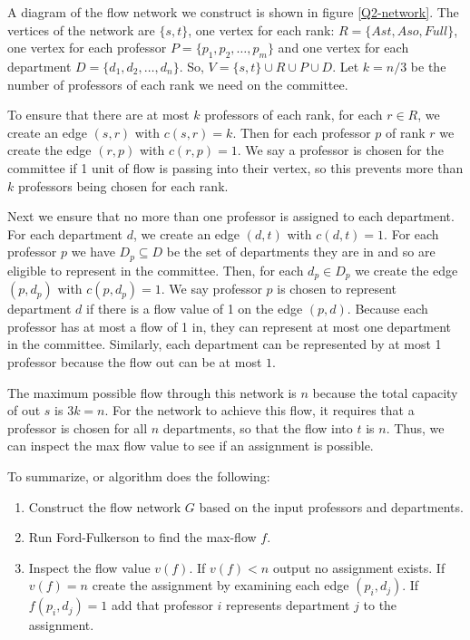 \documentclass[11pt]{exam}
\begin{document}
A diagram of the flow network we construct is shown in figure
\ref{Q2-network}. The vertices of the network are $ \{s, t\} $, one
vertex for each rank: $ R = \{ \mathit{Ast}, \mathit{Aso},
\mathit{Full}\} $, one vertex for each professor $ P = \{p_1, p_2,
\ldots , p_m\} $ and one vertex for each department $ D = \{d_1, d_2,
\ldots , d_n\} $. So, $ V = \{s, t\} \cup R \cup P \cup D $. Let $ k
= n/3 $ be the number of professors of each rank we need on the committee.

To ensure that there are at most $ k $ professors of each rank, for
each $ r \in R $, we create an edge $ (s, r) $ with $ c(s, r) = k $.
Then for each professor $ p $ of rank $ r $ we create the edge $ (r,
p) $ with $ c(r, p) = 1 $. We say a professor is chosen for the
committee if 1 unit of flow is passing into their vertex, so this
prevents more than $ k $ professors being chosen for each rank.

Next we ensure that no more than one professor is assigned to each
department. For each department $ d $, we create an edge $ (d, t) $
with $ c(d, t) = 1 $. For each professor $ p $ we have $ D_p
\subseteq D $ be the set of departments they are in and so are
eligible to represent in the committee. Then, for each $ d_p \in D_p
$ we create the edge $ (p, d_p) $ with $ c(p, d_p) = 1 $. We say
professor $ p $ is chosen to represent department $ d $ if there is a
flow value of 1 on the edge $ (p, d) $. Because each professor has at
most a flow of 1 in, they can represent at most one department in the
committee. Similarly, each department can be represented by at most 1
professor because the flow out can be at most $ 1 $.

The maximum possible flow through this network is $ n $ because the
total capacity of out $ s $ is $ 3 k=n $. For the network to achieve
this flow, it requires that a professor is chosen for all $ n $
departments, so that the flow into $ t $ is $ n $. Thus, we can
inspect the max flow value to see if an assignment is possible.

To summarize, or algorithm does the following:

\begin{enumerate}
  \item Construct the flow network $ G $ based on the input
    professors and departments.
  \item Run Ford-Fulkerson to find the max-flow $ f $.
  \item Inspect the flow value $ v(f) $. If $ v(f) < n $ output no
    assignment exists. If $ v(f) = n $ create the assignment by
    examining each edge $ (p_i, d_j) $. If $ f(p_i, d_j) = 1 $ add
    that professor $ i $ represents department $ j $ to the assignment.
\end{enumerate}
\end{document}
